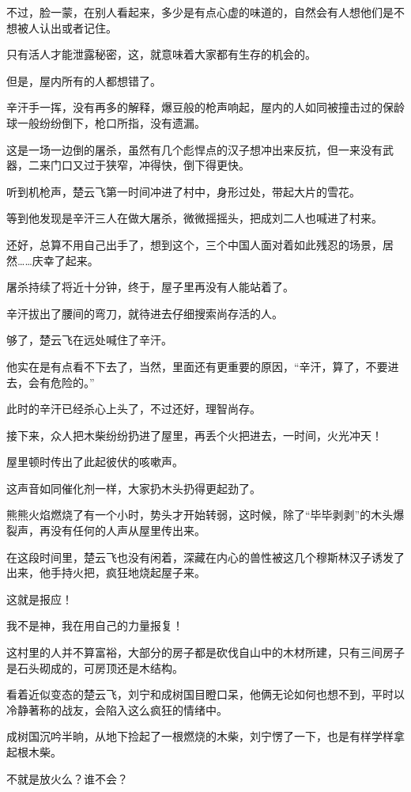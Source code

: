不过，脸一蒙，在别人看起来，多少是有点心虚的味道的，自然会有人想他们是不想被人认出或者记住。

只有活人才能泄露秘密，这，就意味着大家都有生存的机会的。

但是，屋内所有的人都想错了。

辛汗手一挥，没有再多的解释，爆豆般的枪声响起，屋内的人如同被撞击过的保龄球一般纷纷倒下，枪口所指，没有遗漏。

这是一场一边倒的屠杀，虽然有几个彪悍点的汉子想冲出来反抗，但一来没有武器，二来门口又过于狭窄，冲得快，倒下得更快。

听到机枪声，楚云飞第一时间冲进了村中，身形过处，带起大片的雪花。

等到他发现是辛汗三人在做大屠杀，微微摇摇头，把成刘二人也喊进了村来。

还好，总算不用自己出手了，想到这个，三个中国人面对着如此残忍的场景，居然……庆幸了起来。

屠杀持续了将近十分钟，终于，屋子里再没有人能站着了。

辛汗拔出了腰间的弯刀，就待进去仔细搜索尚存活的人。

够了，楚云飞在远处喊住了辛汗。

他实在是有点看不下去了，当然，里面还有更重要的原因，“辛汗，算了，不要进去，会有危险的。”

此时的辛汗已经杀心上头了，不过还好，理智尚存。

接下来，众人把木柴纷纷扔进了屋里，再丢个火把进去，一时间，火光冲天！

屋里顿时传出了此起彼伏的咳嗽声。

这声音如同催化剂一样，大家扔木头扔得更起劲了。

熊熊火焰燃烧了有一个小时，势头才开始转弱，这时候，除了“毕毕剥剥”的木头爆裂声，再没有任何的人声从屋里传出来。

在这段时间里，楚云飞也没有闲着，深藏在内心的兽性被这几个穆斯林汉子诱发了出来，他手持火把，疯狂地烧起屋子来。

这就是报应！

我不是神，我在用自己的力量报复！

这村里的人并不算富裕，大部分的房子都是砍伐自山中的木材所建，只有三间房子是石头砌成的，可房顶还是木结构。

看着近似变态的楚云飞，刘宁和成树国目瞪口呆，他俩无论如何也想不到，平时以冷静著称的战友，会陷入这么疯狂的情绪中。

成树国沉吟半晌，从地下捡起了一根燃烧的木柴，刘宁愣了一下，也是有样学样拿起根木柴。

不就是放火么？谁不会？

